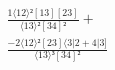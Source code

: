 \documentclass[varwidth, border=5pt]{standalone}
\begin{document}
\begin{my}
$\begin{gathered}
\scriptscriptstyle\frac{1⟨12⟩²[13][23]}{⟨13⟩²[34]²} +\\
\scriptscriptstyle\frac{-2⟨12⟩²[23]⟨3|2+4|3]}{⟨13⟩³[34]²} \phantom{+}
\end{gathered}$
\end{my}
\end{document}

